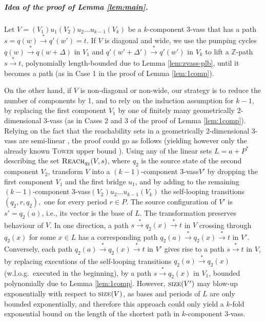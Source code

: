 \documentclass[a4paper, UKenglish, cleveref, autoref, thm-restate]{lipics-v2021}
\newcommand{\Z}{\mathbb{Z}}
\newcommand{\reach}{\textsc{Reach}}
\newcommand{\trans}[1]{\stackrel{#1}{\longrightarrow}}
\newcommand{\tran}{\trans{*}}
\newcommand{\size}{\textsc{size}}
\newcommand{\tower}{\textsc{Tower}\xspace}
\newcommand{\plb}{polynomially length-bounded\xspace}
\newcommand{\vass}{{\sc vass}\xspace}
\newcommand{\tvass}{\parvass 3}
\newcommand{\geomvass}{geometrically 2-dimensional \tvass}
\newcommand{\parvass}[1]{{$#1$-\vass}\xspace}
\newcommand{\ktvass}{(V_1) u_1 (V_2) u_2 \ldots u_{k-1} (V_k)}
\newcommand{\para}[1]{\vspace{-3mm}\subparagraph*{\bf #1.}}
\newcommand{\mywlog}{w.l.o.g.~}
\begin{document}
\para{Idea of the proof of Lemma \ref{lem:main}}

Let $V=\ktvass$ be a $k$-component \tvass  that has a path $s=q(w) \tran q'(w')=t$.
If $V$ is diagonal and wide,
we use the pumping cycles $q(w) \tran q(w+\Delta)$ in $V_1$ and
$q'(w'+\Delta') \tran q'(w')$ in $V_k$ to lift a $\Z$-path $s\tran t$, \plb
due to Lemma \ref{lem:zvass-plb}, until it becomes a path
(as in Case 1 in the proof of Lemma \ref{lem:1comp}).


On the other hand, if $V$ is non-diagonal or non-wide, our strategy is to reduce the number of components
by 1, and to rely on the induction assumption for $k-1$,
by replacing the first component $V_1$ 
by one of finitely many \geomvass 
(as in Cases 2 and 3 of the proof of Lemma \ref{lem:1comp}).
Relying on the fact that the reachability sets in a \geomvass are semi-linear \cite{DBLP:conf/icalp/FuYZ24},
the proof could go as follows (yielding however only the
already known \tower upper bound \cite{DBLP:conf/icalp/FuYZ24}).
Using any of the linear sets $L = a +P^*$
describing the set $\reach_{q_2}(V,s)$, where $q_2$
is the source state of the second component $V_2$,
transform $V$ into a $(k-1)$-component \tvass $V'$ by dropping the first component $V_1$
and the first bridge $u_1$, and by adding to the remaining $(k-1)$-component
\tvass $(V_2)u_2 \ldots u_{k-1}(V_k)$ the self-looping transitions
$
(q_2, r, q_2),
$
one for every period $r\in P$.
The source configuration of $V'$ is $s' = q_2(a)$, i.e., its vector is the base of $L$.
The transformation preserves behaviour of $V$.
In one direction, a path $s\tran q_2(x) \tran t$ in $V$ crossing through $q_2(x)$ for 
some  $x\in L$ has a corresponding path $q_2(a) \tran q_2(x)\tran t$ in $V'$.
Conversely, each path $q_2(a) \tran q_2(x) \tran t$ in $V'$
gives rise to a path $s\tran t$ in $V$, by replacing executions of the self-looping transitions
$q_2(a) \tran q_2(x)$
(\mywlog executed in the beginning), by a path $s\tran q_2(x)$ in $V_1$,
bounded polynomially due to Lemma \ref{lem:1comp}.
However, $\size(V')$ may blow-up exponentially with respect to $\size(V)$, as bases and periods
of $L$ are only bounded exponentially, 
and therefore
this approach could only yield a $k$-fold exponential bound on the length of the shortest path
in $k$-component \tvass.
\end{document}
